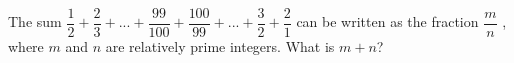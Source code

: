 The sum $\dfrac{1}{2} +  \dfrac{2}{3} +... +  \dfrac{99}{100} +  \dfrac{100}{99} + ...+  \dfrac{3}{2} +  \dfrac{2}{1}$ can be written as the fraction $\dfrac{m}{n}$ , where $m$ and $n$ are relatively prime integers. What is $m + n$?
